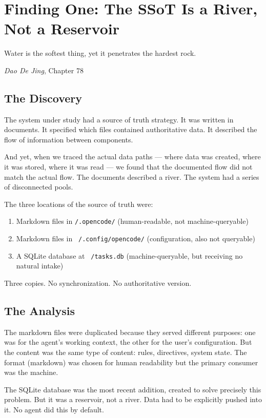 \documentclass[12pt,a4paper,oneside]{book}
\begin{document}
\chapter{Finding One: The SSoT Is a River, Not a Reservoir}

\epigraph{Water is the softest thing, yet it penetrates the hardest rock.}{\textit{Dao De Jing}, Chapter 78}

\section{The Discovery}

The system under study had a source of truth strategy. It was written in documents. It specified which files contained authoritative data. It described the flow of information between components.

And yet, when we traced the actual data paths --- where data was created, where it was stored, where it was read --- we found that the documented flow did not match the actual flow. The documents described a river. The system had a series of disconnected pools.

The three locations of the source of truth were:
\begin{enumerate}
  \item Markdown files in \texttt{/.opencode/} (human-readable, not machine-queryable)
  \item Markdown files in \texttt{~/.config/opencode/} (configuration, also not queryable)
  \item A SQLite database at \texttt{~/tasks.db} (machine-queryable, but receiving no natural intake)
\end{enumerate}

Three copies. No synchronization. No authoritative version.

\section{The Analysis}

The markdown files were duplicated because they served different purposes: one was for the agent's working context, the other for the user's configuration. But the content was the same type of content: rules, directives, system state. The format (markdown) was chosen for human readability but the primary consumer was the machine.

The SQLite database was the most recent addition, created to solve precisely this problem. But it was a reservoir, not a river. Data had to be explicitly pushed into it. No agent did this by default.
\end{document}
